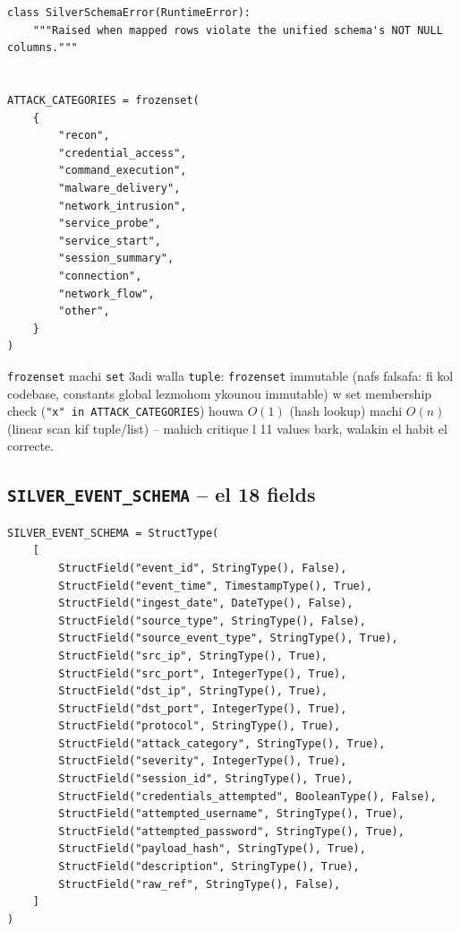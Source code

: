 \documentclass[11pt,a4paper]{report}
\DeclareRobustCommand{\code}[1]{\texttt{#1}}
\begin{document}
\begin{lstlisting}[style=pystyle]
class SilverSchemaError(RuntimeError):
    """Raised when mapped rows violate the unified schema's NOT NULL columns."""


ATTACK_CATEGORIES = frozenset(
    {
        "recon",
        "credential_access",
        "command_execution",
        "malware_delivery",
        "network_intrusion",
        "service_probe",
        "service_start",
        "session_summary",
        "connection",
        "network_flow",
        "other",
    }
)
\end{lstlisting}

\code{frozenset} machi \code{set} 3adi walla \code{tuple}: \code{frozenset}
immutable (nafs falsafa: fi kol codebase, constants global lezmohom
ykounou immutable) w set membership check (\code{"x" in ATTACK\_CATEGORIES})
houwa $O(1)$ (hash lookup) machi $O(n)$ (linear scan kif tuple/list) -- mahich
critique l 11 values bark, walakin el habit el correcte.

\subsection{\code{SILVER\_EVENT\_SCHEMA} -- el 18 fields}

\begin{lstlisting}[style=pystyle]
SILVER_EVENT_SCHEMA = StructType(
    [
        StructField("event_id", StringType(), False),
        StructField("event_time", TimestampType(), True),
        StructField("ingest_date", DateType(), False),
        StructField("source_type", StringType(), False),
        StructField("source_event_type", StringType(), True),
        StructField("src_ip", StringType(), True),
        StructField("src_port", IntegerType(), True),
        StructField("dst_ip", StringType(), True),
        StructField("dst_port", IntegerType(), True),
        StructField("protocol", StringType(), True),
        StructField("attack_category", StringType(), True),
        StructField("severity", IntegerType(), True),
        StructField("session_id", StringType(), True),
        StructField("credentials_attempted", BooleanType(), False),
        StructField("attempted_username", StringType(), True),
        StructField("attempted_password", StringType(), True),
        StructField("payload_hash", StringType(), True),
        StructField("description", StringType(), True),
        StructField("raw_ref", StringType(), False),
    ]
)
\end{lstlisting}
\end{document}
